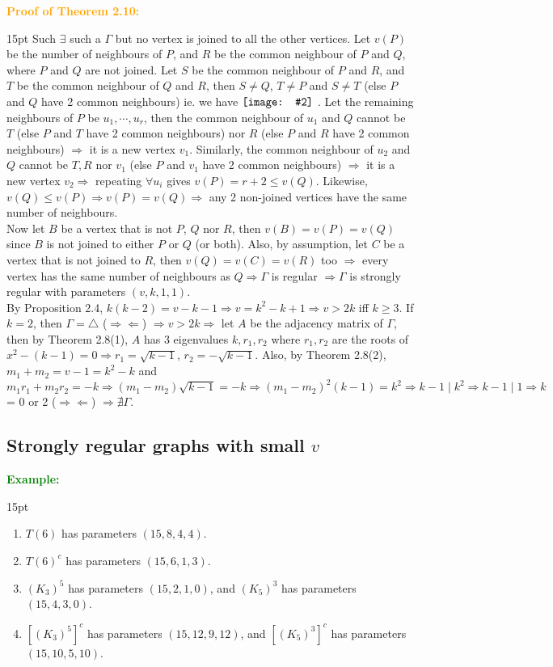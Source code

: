 \documentclass[12pt]{article}
\newcommand{\noparskip}{\vspace{-\parskip}}
\newenvironment{points}
	{\begin{enumerate}[label = (\arabic*)]}
	{\end{enumerate}}
\newenvironment{dent}
	{\begin{adjustwidth}{15pt}{}\noparskip}
	{\end{adjustwidth}}
\newenvironment{proof}[1]
	{\textcolor{Orange}{\textbf{Proof of #1:}}\begin{dent}}
	{\end{dent}}
\newenvironment{example}
	{\textcolor{Green}{\textbf{Example:}}\begin{dent}}
	{\end{dent}}
\newcommand{\pic}[2][1.0]{
	$\vcenter{\hbox{\texttt{[image: \#2]}\ }}$}
\renewcommand{\implies}{\Rightarrow}
\newcommand{\contradiction}{\Rightarrow \Leftarrow}
\begin{document}
\begin{proof}{Theorem 2.10}
Such $\exists$ such a $\Gamma$ but no vertex is joined to all the other vertices. Let $v(P)$ be the number of neighbours of $P$, and $R$ be the common neighbour of $P$ and $Q$, where $P$ and $Q$ are not joined. Let $S$ be the common neighbour of $P$ and $R$, and $T$ be the common neighbour of $Q$ and $R$, then $S \ne Q$, $T \ne P$ and $S \ne T$ (else $P$ and $Q$ have 2 common neighbours) ie. we have \pic[0.3]{13.png}. Let the remaining neighbours of $P$ be $u_1, \cdots, u_r$, then the common neighbour of $u_1$ and $Q$ cannot be $T$ (else $P$ and $T$ have 2 common neighbours) nor $R$ (else $P$ and $R$ have 2 common neighbours) $\implies$ it is a new vertex $v_1$. Similarly, the common neighbour of $u_2$ and $Q$ cannot be $T, R$ nor $v_1$ (else $P$ and $v_1$ have 2 common neighbours) $\implies$ it is a new vertex $v_2 \implies$ repeating $\forall u_i$ gives $v(P) = r + 2 \le v(Q)$. Likewise, $v(Q) \le v(P) \implies v(P) = v(Q) \implies$ any 2 non-joined vertices have the same number of neighbours. \\
Now let $B$ be a vertex that is not $P$, $Q$ nor $R$, then $v(B) = v(P) = v(Q)$ since $B$ is not joined to either $P$ or $Q$ (or both). Also, by assumption, let $C$ be a vertex that is not joined to $R$, then $v(Q) = v(C) = v(R)$ too $\implies$ every vertex has the same number of neighbours as $Q \implies \Gamma$ is regular $\implies \Gamma$ is strongly regular with parameters $(v, k, 1, 1)$. \\
By Proposition 2.4, $k(k - 2) = v - k - 1 \implies v = k^2 - k + 1 \implies v > 2k$ iff $k \ge 3$. If $k = 2$, then $\Gamma = \triangle$ ($\contradiction$) $\implies v > 2k \implies$ let $A$ be the adjacency matrix of $\Gamma$, then by Theorem 2.8(1), $A$ has 3 eigenvalues $k, r_1, r_2$ where $r_1, r_2$ are the roots of $x^2 - (k - 1) = 0 \implies r_1 = \sqrt{k - 1}$, $r_2 = -\sqrt{k - 1}$. Also, by Theorem 2.8(2), $m_1 + m_2 = v - 1 = k^2 - k$ and $m_1 r_1 + m_2 r_2 = -k \implies (m_1 - m_2) \sqrt{k - 1} = -k \implies (m_1 - m_2)^2 (k - 1) = k^2 \implies k - 1 \mid k^2 \implies k - 1 \mid 1 \implies k$ = 0 or 2 ($\contradiction$) $\implies \nexists \Gamma$.
\end{proof}

\subsection{Strongly regular graphs with small $v$}

\begin{example}
\begin{points}
\item $T(6)$ has parameters $(15, 8, 4, 4)$.
\item $T(6)^c$ has parameters $(15, 6, 1, 3)$.
\item $(K_3)^5$ has parameters $(15, 2, 1, 0)$, and $(K_5)^3$ has parameters $(15, 4, 3, 0)$.
\item $\left[ (K_3)^5 \right]^c$ has parameters $(15, 12, 9, 12)$, and $\left[ (K_5)^3 \right]^c$ has parameters $(15, 10, 5, 10)$.
\end{points}
\end{example}
\end{document}
